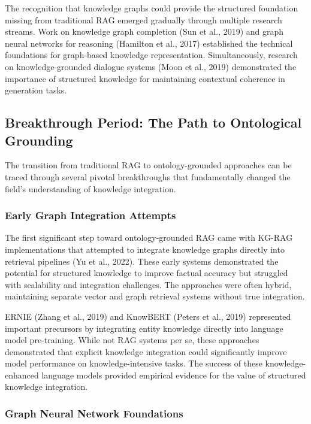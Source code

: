 \documentclass[12pt]{report}
\begin{document}
The recognition that knowledge graphs could provide the structured foundation missing from traditional RAG emerged gradually through multiple research streams. Work on knowledge graph completion (Sun et al., 2019) and graph neural networks for reasoning (Hamilton et al., 2017) established the technical foundations for graph-based knowledge representation. Simultaneously, research on knowledge-grounded dialogue systems (Moon et al., 2019) demonstrated the importance of structured knowledge for maintaining contextual coherence in generation tasks.

\subsection{Breakthrough Period: The Path to Ontological Grounding}

The transition from traditional RAG to ontology-grounded approaches can be traced through several pivotal breakthroughs that fundamentally changed the field's understanding of knowledge integration.

\subsubsection{Early Graph Integration Attempts}

The first significant step toward ontology-grounded RAG came with KG-RAG implementations that attempted to integrate knowledge graphs directly into retrieval pipelines (Yu et al., 2022). These early systems demonstrated the potential for structured knowledge to improve factual accuracy but struggled with scalability and integration challenges. The approaches were often hybrid, maintaining separate vector and graph retrieval systems without true integration.

ERNIE (Zhang et al., 2019) and KnowBERT (Peters et al., 2019) represented important precursors by integrating entity knowledge directly into language model pre-training. While not RAG systems per se, these approaches demonstrated that explicit knowledge integration could significantly improve model performance on knowledge-intensive tasks. The success of these knowledge-enhanced language models provided empirical evidence for the value of structured knowledge integration.

\subsubsection{Graph Neural Network Foundations}
\end{document}
